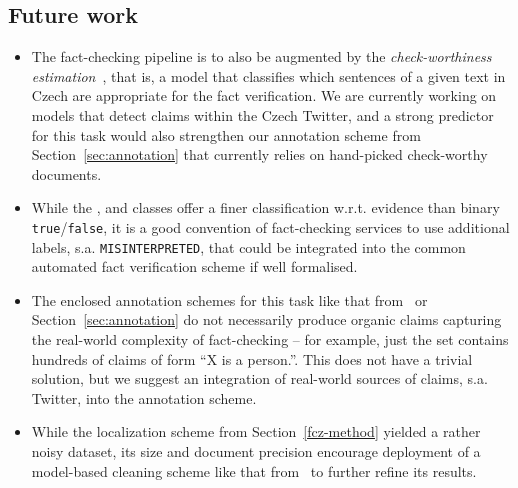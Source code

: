 \subsection{Future work}
\begin{itemize}
    \item The fact-checking pipeline is to also be augmented by the \textit{check-worthiness estimation}~\cite{nakov2021automated}, that is, a model that classifies which sentences of a given text in Czech are appropriate for the fact verification.
    We are currently working on models that detect claims within the Czech Twitter, and a strong predictor for this task would also strengthen our annotation scheme from Section~\ref{sec:annotation} that currently relies on hand-picked check-worthy documents.
    \item While the \SUP, \REF{} and \NEI{} classes  offer a finer classification w.r.t. evidence than binary \texttt{true}/\texttt{false}, it is a good convention of fact-checking services to use additional labels, s.a. \texttt{MISINTERPRETED}, that could be integrated into the common automated fact verification scheme if well formalised.
    \item The enclosed annotation schemes for this task like that from~\cite{fever2018} or Section~\ref{sec:annotation} do not necessarily produce organic claims capturing the real-world complexity of fact-checking -- for example, just the \FEN \train set contains hundreds of claims of form \enquote{X is a person.}.
    This does not have a trivial solution, but we suggest an integration of real-world sources of claims, s.a. Twitter, into the annotation scheme.
    \item While the \FEVER localization scheme from Section~\ref{fcz-method} yielded a rather noisy dataset, its size and document precision encourage
    deployment of a model-based cleaning scheme like that from~\cite{Jeatrakul} to further refine its results.
\end{itemize}